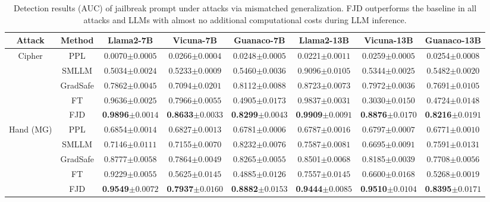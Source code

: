 \documentclass{article}
\begin{document}
\begin{table}[t]
    \centering
    \caption{Detection results (AUC) of jailbreak prompt under attacks via mismatched generalization. FJD outperforms the baseline in all attacks and LLMs with almost no additional computational costs during LLM inference.}

    \setlength\tabcolsep{8pt}
    \scriptsize
    \begin{tabular}{cccccccc}
        \toprule
        \textbf{Attack} & \textbf{Method} & \textbf{Llama2-7B} &  \textbf{Vicuna-7B} &  \textbf{Guanaco-7B} & \textbf{Llama2-13B} &  \textbf{Vicuna-13B} &  \textbf{Guanaco-13B}\\
        \midrule

        \multirow{4}{*}{Cipher}
        & PPL & 0.0070\tiny{$\pm 0.0005$} & 0.0266\tiny{$\pm 0.0004$} & 0.0248\tiny{$\pm 0.0005$} & 0.0221\tiny{$\pm 0.0011$} & 0.0259\tiny{$\pm 0.0005$} & 0.0254\tiny{$\pm 0.0008$}\\
        & SMLLM & 0.5034\tiny{$\pm 0.0024$} & 0.5233\tiny{$\pm 0.0009$} & 0.5460\tiny{$\pm 0.0036$} & 0.9096\tiny{$\pm 0.0105$} & 0.5344\tiny{$\pm 0.0025$} & 0.5482\tiny{$\pm 0.0020$} \\
        & GradSafe & 0.7862\tiny{$\pm 0.0045$} & 0.7094\tiny{$\pm 0.0201$} & 0.8112\tiny{$\pm 0.0088$} & 0.8723\tiny{$\pm 0.0073$} & 0.7972\tiny{$\pm 0.0036$} & 0.7691\tiny{$\pm 0.0105$} \\
        & FT & 0.9636\tiny{$\pm 0.0025$} & 0.7966\tiny{$\pm 0.0055$} & 0.4905\tiny{$\pm 0.0173$} & 0.9837\tiny{$\pm 0.0031$} & 0.3030\tiny{$\pm 0.0150$} & 0.4724\tiny{$\pm 0.0148$} \\
        \rowcolor{lightgray} & FJD & \textbf{0.9896}\tiny{$\pm 0.0014$} & \textbf{0.8633}\tiny{$\pm 0.0033$} & \textbf{0.8299}\tiny{$\pm 0.0043$} & \textbf{0.9909}\tiny{$\pm 0.0091$} & \textbf{0.8876}\tiny{$\pm 0.0170$} & \textbf{0.8216}\tiny{$\pm 0.0191$}\\
        \midrule
        
        \multirow{4}{*}{Hand (MG)} 
        & PPL & 0.6854\tiny{$\pm 0.0014$} & 0.6827\tiny{$\pm 0.0013$} & 0.6781\tiny{$\pm 0.0006$}& 0.6787\tiny{$\pm 0.0016$} & 0.6797\tiny{$\pm 0.0007$} & 0.6771\tiny{$\pm 0.0010$}\\
        & SMLLM & 0.7146\tiny{$\pm 0.0111$} & 0.7155\tiny{$\pm 0.0070$} & 0.8232\tiny{$\pm 0.0076$} & 0.7587\tiny{$\pm 0.0081$} & 0.6695\tiny{$\pm 0.0091$} & 0.7591\tiny{$\pm 0.0131$}\\
        & GradSafe & 0.8777\tiny{$\pm 0.0058$} & 0.7864\tiny{$\pm 0.0049$} & 0.8265\tiny{$\pm 0.0055$} & 0.8501\tiny{$\pm 0.0068$} & 0.8185\tiny{$\pm 0.0039$} & 0.7708\tiny{$\pm 0.0056$}\\
        & FT & 0.9229\tiny{$\pm 0.0055$} & 0.5625\tiny{$\pm 0.0145$} & 0.4885\tiny{$\pm 0.0126$} & 0.7557\tiny{$\pm 0.0145$} & 0.6600\tiny{$\pm 0.0168$} & 0.5268\tiny{$\pm 0.0019$}\\
        \rowcolor{lightgray} & FJD & \textbf{0.9549}\tiny{$\pm 0.0072$} & \textbf{0.7937}\tiny{$\pm 0.0160$} & \textbf{0.8882}\tiny{$\pm 0.0153$} & \textbf{0.9444}\tiny{$\pm 0.0085$} & \textbf{0.9510}\tiny{$\pm 0.0104$} & \textbf{0.8395}\tiny{$\pm 0.0171$}\\


\end{tabular}
\end{table}
\end{document}
